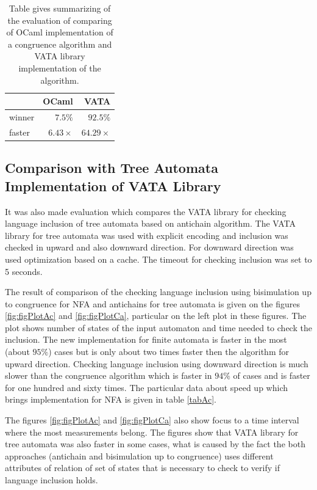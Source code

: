 \begin{center}
\begin{table}[tb]
\begin{center}
  \begin{tabular}{ | l | r | r |}
   \hline
    & \textbf{OCaml} & \textbf{VATA} \\ \hline \hline
    winner & $7.5\%$ & $92.5\%$ \\ \hline
    faster & $6.43\times$ & $64.29\times$ \\ \hline
   \end{tabular}
   \caption{Table gives summarizing of the evaluation of comparing of OCaml implementation of a congruence algorithm and VATA library implementation 
     of the algorithm.}
   \label{tabOcaml}
\end{center}
\end{table}
\end{center}

\subsection{Comparison with Tree Automata Implementation of VATA Library}
It was also made evaluation which compares the VATA library for checking language inclusion of tree automata based on antichain algorithm. The 
VATA library for tree automata was used with explicit encoding and inclusion was checked in upward and also downward direction. For downward direction was used
optimization based on a cache. The timeout for checking inclusion was set to 5 seconds.

The result of comparison of the checking language inclusion using bisimulation up to congruence for NFA and antichains for tree automata 
is given on the figures \ref{fig:figPlotAc} and \ref{fig:figPlotCa}, particular on the left plot in these figures. The plot shows number of states of the input
automaton and time needed to check the inclusion. The new implementation for finite automata is faster in the
most (about $95\%$) cases but is only about two times faster then the algorithm for upward direction. 
Checking language inclusion using downward direction is much slower than 
the congruence algorithm which is faster in $94\%$ of cases  and is faster for one hundred and sixty times. The particular data about speed up 
which brings implementation for NFA is given in table \ref{tabAc}.

The figures \ref{fig:figPlotAc} and \ref{fig:figPlotCa} also show
focus to a time interval where the most measurements belong. The figures show that VATA library for tree automata was
also faster in some cases, what is caused by the fact the both approaches (antichain and bisimulation up to congruence) uses different attributes of relation
of set of states that is necessary to check to verify if language inclusion holds.

